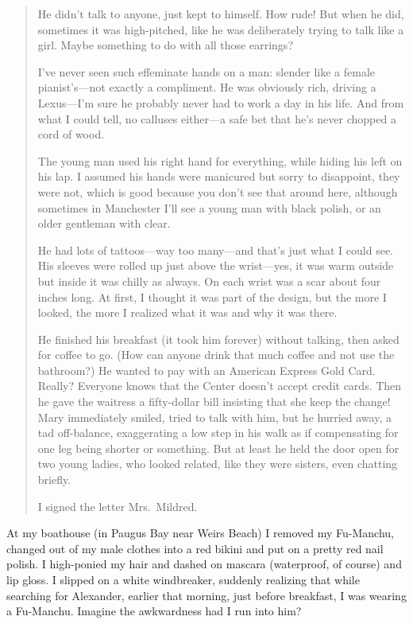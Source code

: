 \begin{quote}
He didn't talk to anyone, just kept to himself. How rude! But when he
did, sometimes it was high-pitched, like he was deliberately trying to
talk like a girl. Maybe something to do with all those earrings?

I've never seen such effeminate hands on a man: slender like a female
pianist's---not exactly a compliment. He was obviously rich, driving a
Lexus---I'm sure he probably never had to work a day in his life. And
from what I could tell, no calluses either---a safe bet that he's never
chopped a cord of wood.

The young man used his right hand for everything, while hiding his left
on his lap. I assumed his hands were manicured but sorry to disappoint,
they were not, which is good because you don't see that around here,
although sometimes in Manchester I'll see a young man with black polish,
or an older gentleman with clear.

He had lots of tattoos---way too many---and that's just what I could
see. His sleeves were rolled up just above the wrist---yes, it was warm
outside but inside it was chilly as always. On each wrist was a scar
about four inches long. At first, I thought it was part of the design,
but the more I looked, the more I realized what it was and why it was
there.

He finished his breakfast (it took him forever) without talking, then
asked for coffee to go. (How can anyone drink that much coffee and not
use the bathroom?) He wanted to pay with an American Express Gold Card.
Really? Everyone knows that the Center doesn't accept credit cards. Then
he gave the waitress a fifty-dollar bill insisting that she keep the
change! Mary immediately smiled, tried to talk with him, but he hurried
away, a tad off-balance, exaggerating a low step in his walk as if
compensating for one leg being shorter or something. But at least he
held the door open for two young ladies, who looked related, like they
were sisters, even chatting briefly.

I signed the letter Mrs.~Mildred.
\end{quote}

\noindent At my boathouse (in Paugus Bay near Weirs Beach) I removed my
Fu-Manchu, changed out of my male clothes into a red bikini and put on a
pretty red nail polish. I high-ponied my hair and dashed on mascara
(waterproof, of course) and lip gloss. I slipped on a white windbreaker,
suddenly realizing that while searching for Alexander, earlier that
morning, just before breakfast, I was wearing a Fu-Manchu. Imagine the
awkwardness had I run into him?


